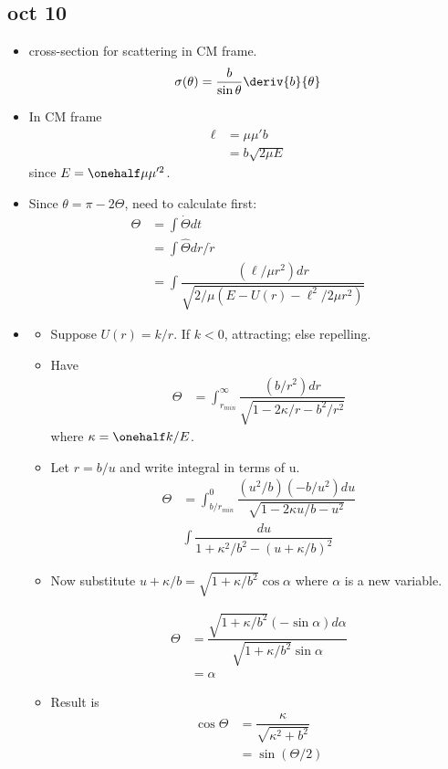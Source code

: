 \documentclass[10pt, twocolumn]{article}
\begin{document}
\subsection{oct 10}
\begin{itemize}
	\item cross-section for scattering in CM frame. 
	\begin{align}
		\sigma(\theta) = \frac{b}{\sin\theta}\deriv{b}{\theta}
	\end{align}
	\item In CM frame
	\begin{align}
		\ell &= \mu \mu' b \\
		&= b \sqrt{2 \mu E}
	\end{align}
	since $E = \onehalf \mu \mu'^2$. 
	
	\item Since $\theta = \pi - 2\Theta$, need to calculate first:
	\begin{align}
		\Theta &= \int \dot{\Theta} dt \\
		&= \int \hat{\Theta} dr/\dot{r} \\
		&= \int \dfrac{(\ell/\mu r^2) dr}{\sqrt{2/\mu (E - U(r) - \ell^2/2\mu r^2)}}
	\end{align}
	
	\item {}
	\begin{itemize}
		\item Suppose $U(r) = k/r$. If $k < 0$, attracting; else repelling. 
		\item Have 
		\begin{align}
				\Theta &= \int_{r_{min}}^\infty \dfrac{(b/ r^2) dr}{\sqrt{1 - 2\kappa/r - b^2/r^2}}
		\end{align}
		where $\kappa = \onehalf k/E$. 
		\item Let $r = b/u$ and write integral in terms of u. 
		\begin{align}
			\Theta &=\int_{b/r_{min}}^0 \dfrac{(u^2/ b) (-b/u^2)du}{\sqrt{1 - 2\kappa u/b - u^2}} \\
			&\int \dfrac{du}{1 + \kappa^2/b^2 - (u + \kappa/b)^2}
		\end{align}
		\item Now substitute $u + \kappa/b = \sqrt{1 + \kappa/b^2} \cos\alpha$ where $\alpha$ is a new variable.
		
			 
		\begin{align}
			\Theta &= \dfrac{ \sqrt{1 + \kappa/b^2} (-\sin\alpha)d\alpha}{ \sqrt{1 + \kappa/b^2} \sin\alpha} \\
			&= \alpha
		\end{align}
		
		\item Result is 
		\begin{align}
			\cos\Theta &= \dfrac{\kappa}{\sqrt{\kappa^2 + b^2}} \\
			&= \sin(\Theta/2)
		\end{align}
	\end{itemize}
\end{itemize}
\end{document}
